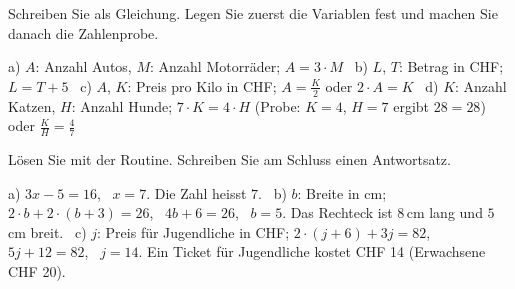 \documentclass[11pt]{exam}
\begin{document}
\begin{questions}

\question Schreiben Sie als Gleichung. Legen Sie zuerst die Variablen fest und
machen Sie danach die Zahlenprobe.
\begin{solution}
  a) $A$: Anzahl Autos, $M$: Anzahl Motorräder; $A = 3 \cdot M$ \
  b) $L$, $T$: Betrag in CHF; $L = T + 5$ \
  c) $A$, $K$: Preis pro Kilo in CHF; $A = \frac{K}{2}$ oder $2 \cdot A = K$ \
  d) $K$: Anzahl Katzen, $H$: Anzahl Hunde; $7 \cdot K = 4 \cdot H$
  (Probe: $K = 4$, $H = 7$ ergibt $28 = 28$) oder $\frac{K}{H} = \frac{4}{7}$
\end{solution}
\raum{4cm}

\question Lösen Sie mit der Routine. Schreiben Sie am Schluss einen
Antwortsatz.
\begin{solution}
  a) $3x - 5 = 16$, \ $x = 7$. Die Zahl heisst $7$. \
  b) $b$: Breite in cm; $2 \cdot b + 2 \cdot (b + 3) = 26$, \ $4b + 6 = 26$,
  \ $b = 5$. Das Rechteck ist $8$\,cm lang und $5$\,cm breit. \
  c) $j$: Preis für Jugendliche in CHF; $2 \cdot (j + 6) + 3j = 82$,
  \ $5j + 12 = 82$, \ $j = 14$. Ein Ticket für Jugendliche kostet CHF 14
  (Erwachsene CHF 20).
\end{solution}
\raum{6cm}


\end{questions}
\end{document}

